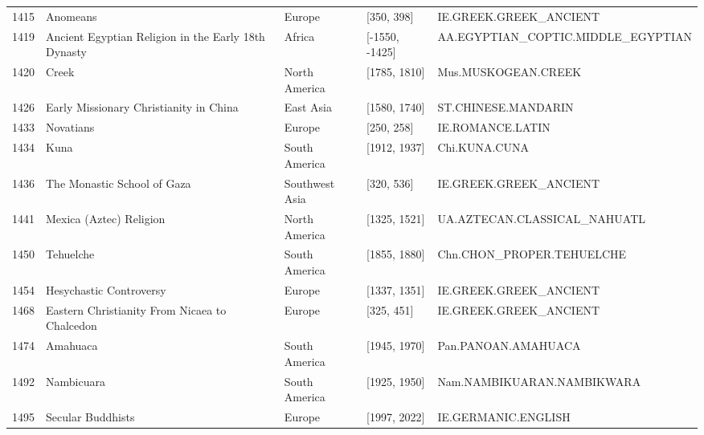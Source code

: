 {\begin{longtable}{rp{3.5cm}llp{3.5cm}}
1415 & {\raggedright Anomeans} & Europe & [350, 398] & {\raggedright IE.\allowbreak{}GREEK.\allowbreak{}GREEK\_\allowbreak{}ANCIENT} \\
1419 & {\raggedright Ancient Egyptian Religion in the Early 18th Dynasty} & Africa & [-1550, -1425] & {\raggedright AA.\allowbreak{}EGYPTIAN\_\allowbreak{}COPTIC.\allowbreak{}MIDDLE\_\allowbreak{}EGYPTIAN} \\
1420 & {\raggedright Creek} & North America & [1785, 1810] & {\raggedright Mus.\allowbreak{}MUSKOGEAN.\allowbreak{}CREEK} \\
1426 & {\raggedright Early Missionary Christianity in China} & East Asia & [1580, 1740] & {\raggedright ST.\allowbreak{}CHINESE.\allowbreak{}MANDARIN} \\
1433 & {\raggedright Novatians} & Europe & [250, 258] & {\raggedright IE.\allowbreak{}ROMANCE.\allowbreak{}LATIN} \\
1434 & {\raggedright Kuna} & South America & [1912, 1937] & {\raggedright Chi.\allowbreak{}KUNA.\allowbreak{}CUNA} \\
1436 & {\raggedright The Monastic School of Gaza} & Southwest Asia & [320, 536] & {\raggedright IE.\allowbreak{}GREEK.\allowbreak{}GREEK\_\allowbreak{}ANCIENT} \\
1441 & {\raggedright Mexica (Aztec) Religion} & North America & [1325, 1521] & {\raggedright UA.\allowbreak{}AZTECAN.\allowbreak{}CLASSICAL\_\allowbreak{}NAHUATL} \\
1450 & {\raggedright Tehuelche} & South America & [1855, 1880] & {\raggedright Chn.\allowbreak{}CHON\_\allowbreak{}PROPER.\allowbreak{}TEHUELCHE} \\
1454 & {\raggedright Hesychastic Controversy} & Europe & [1337, 1351] & {\raggedright IE.\allowbreak{}GREEK.\allowbreak{}GREEK\_\allowbreak{}ANCIENT} \\
1468 & {\raggedright Eastern Christianity From Nicaea to Chalcedon} & Europe & [325, 451] & {\raggedright IE.\allowbreak{}GREEK.\allowbreak{}GREEK\_\allowbreak{}ANCIENT} \\
1474 & {\raggedright Amahuaca} & South America & [1945, 1970] & {\raggedright Pan.\allowbreak{}PANOAN.\allowbreak{}AMAHUACA} \\
1492 & {\raggedright Nambicuara} & South America & [1925, 1950] & {\raggedright Nam.\allowbreak{}NAMBIKUARAN.\allowbreak{}NAMBIKWARA} \\
1495 & {\raggedright Secular Buddhists} & Europe & [1997, 2022] & {\raggedright IE.\allowbreak{}GERMANIC.\allowbreak{}ENGLISH} \\

\end{longtable}}
